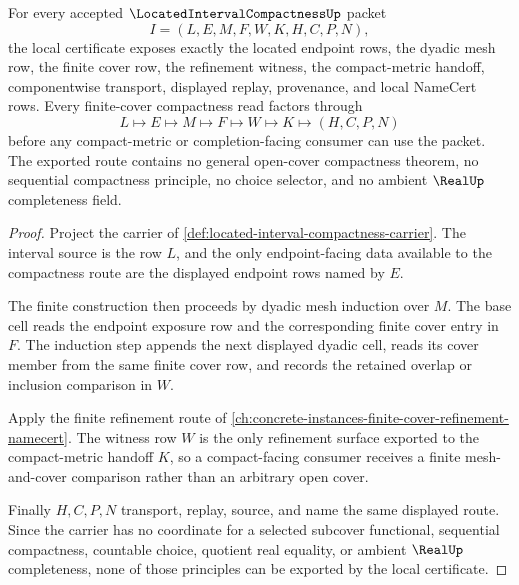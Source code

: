 \begin{theorem}
\label{thm:located-interval-compactness-carrier}
For every accepted $\LocatedIntervalCompactnessUp$ packet
$$
I=(L,E,M,F,W,K,H,C,P,N),
$$
the local certificate exposes exactly the located endpoint rows, the dyadic mesh row, the finite cover row, the refinement witness, the compact-metric handoff, componentwise transport, displayed replay, provenance, and local NameCert rows. Every finite-cover compactness read factors through
$$
L\longmapsto E\longmapsto M\longmapsto F\longmapsto W\longmapsto K\longmapsto(H,C,P,N)
$$
before any compact-metric or completion-facing consumer can use the packet. The exported route contains no general open-cover compactness theorem, no sequential compactness principle, no choice selector, and no ambient $\RealUp$ completeness field.
\end{theorem}
\begin{proof}
Project the carrier of \autoref{def:located-interval-compactness-carrier}. The interval source is the row $L$, and the only endpoint-facing data available to the compactness route are the displayed endpoint rows named by $E$.

The finite construction then proceeds by dyadic mesh induction over $M$. The base cell reads the endpoint exposure row and the corresponding finite cover entry in $F$. The induction step appends the next displayed dyadic cell, reads its cover member from the same finite cover row, and records the retained overlap or inclusion comparison in $W$.

Apply the finite refinement route of \autoref{ch:concrete-instances-finite-cover-refinement-namecert}. The witness row $W$ is the only refinement surface exported to the compact-metric handoff $K$, so a compact-facing consumer receives a finite mesh-and-cover comparison rather than an arbitrary open cover.

Finally $H,C,P,N$ transport, replay, source, and name the same displayed route. Since the carrier has no coordinate for a selected subcover functional, sequential compactness, countable choice, quotient real equality, or ambient $\RealUp$ completeness, none of those principles can be exported by the local certificate.
\end{proof}

